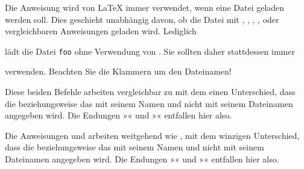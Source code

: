 Die Anweisung  wird von \LaTeX{} immer verwendet,
wenn eine Datei geladen werden soll. Dies geschieht unabhängig davon, ob die
Datei mit , , ,
,  oder vergleichbaren Anweisungen
geladen wird. Lediglich
\begin{lstcode}
  
\end{lstcode}
lädt die Datei \texttt{foo} ohne Verwendung von . Sie
sollten daher stattdessen immer
\begin{lstcode}
  
\end{lstcode}
verwenden. Beachten Sie die Klammern um den Dateinamen!%
%
\EndIndexGroup


\begin{Declaration}
\end{Declaration}%
Diese beiden Befehle arbeiten vergleichbar zu
 mit dem einen Unterschied, dass die
 beziehungsweise das  mit seinem Namen und nicht
mit seinem Dateinamen angegeben wird. Die Endungen »« und
»« entfallen hier also.%
%
\EndIndexGroup


\begin{Declaration}
\end{Declaration}%
Die Anweisungen  und  arbeiten
weitgehend wie , mit dem winzigen
Unterschied, dass die  beziehungsweise das  mit
seinem Namen und nicht mit seinem Dateinamen angegeben wird. Die Endungen
»« und »« entfallen hier also.

